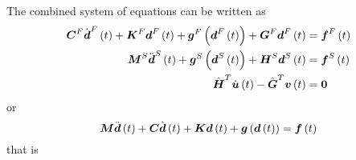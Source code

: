 The combined system of equations can be written as
\begin{align}
  \matr{C}^{F}\fnof{{\dot{\vectr{d}}}^{F}}{t}+\matr{K}^{F}\fnof{\vectr{d}^{F}}{t}+\fnof{\vectr{g}^{F}}{\fnof{\vectr{d}^{F}}{t}}+\matr{G}^{F}\fnof{\vectr{d}^{F}}{t}&=\fnof{\vectr{f}^{F}}{t} \\
  \matr{M}^{S}\fnof{{\ddot{\vectr{d}}}^{S}}{t}+\fnof{\vectr{g}^{S}}{\fnof{\vectr{d}^{S}}{t}}+\matr{H}^{S}\fnof{\vectr{d}^{S}}{t}&=\fnof{\vectr{f}^{S}}{t}
  \\
  \transpose{\hat{\matr{H}}}\fnof{\dot{\vectr{u}}}{t}-\transpose{\hat{\matr{G}}}\fnof{\vectr{v}}{t}&=\vectr{0}
\end{align}
or
\begin{equation}
  \matr{M}\fnof{\ddot{\vectr{d}}}{t}+\matr{C}\fnof{\dot{\vectr{d}}}{t}+\matr{K}\fnof{\vectr{d}}{t}+\fnof{\vectr{g}}{\fnof{\vectr{d}}{t}}=\fnof{\vectr{f}}{t}
\end{equation}
that is
